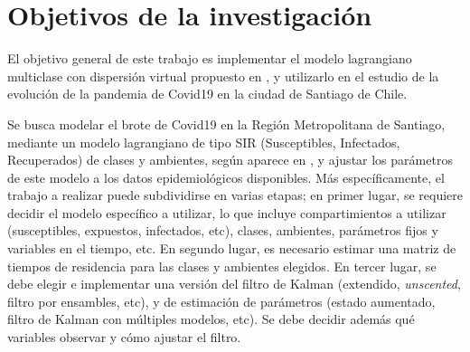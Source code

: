 \section{Objetivos de la investigación}



El objetivo general de este trabajo es implementar el modelo lagrangiano multiclase con dispersión virtual propuesto en \cite{Bichara2015}, y utilizarlo en el estudio de la evolución de la pandemia de Covid19 en la ciudad de Santiago de Chile. 


Se busca modelar el brote de Covid19 en la Región Metropolitana de Santiago, mediante un modelo lagrangiano de tipo SIR (Susceptibles, Infectados, Recuperados) de clases y ambientes, según aparece en \cite{Bichara2015}, y ajustar los parámetros de este modelo a los datos epidemiológicos disponibles.
Más específicamente, el trabajo a realizar puede subdividirse en varias etapas; en primer lugar, se requiere decidir el modelo específico a utilizar, lo que incluye compartimientos a utilizar (susceptibles, expuestos, infectados, etc), clases, ambientes, parámetros fijos y variables en el tiempo, etc. En segundo lugar, es necesario estimar una matriz de tiempos de residencia para las clases y ambientes elegidos. En tercer lugar, se debe elegir e implementar una versión del filtro de Kalman (extendido, \textit{unscented}, filtro por ensambles, etc), y de estimación de parámetros (estado aumentado, filtro de Kalman con múltiples modelos, etc). Se debe decidir además qué variables observar y cómo ajustar el filtro.

